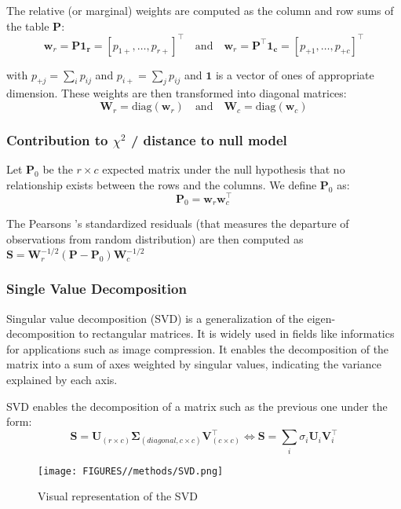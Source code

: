 The relative (or marginal) weights are computed as the column and row sums of the table $\mathbf{P}$: 
$$
    \mathbf{w}_r = \mathbf{P1_r}=\left[ p_{1+}, \dots, p_{r+}\right]^\top \quad \text{and} \quad \mathbf{w}_r = \mathbf{P}^\top \mathbf{1_c} = \left[ p_{+ 1}, \dots, p_{+ c}\right]^\top
$$

with $p_{+j} = \sum_ip_{ij}$ and $p_{i+} = \sum_jp_{ij}$ and $\mathbf{1}$ is a vector of ones of appropriate dimension. These weights are then transformed into diagonal matrices: 
$$
    \mathbf{W}_r = \text{diag}\left(\mathbf{w}_r\right) \quad \text{and} \quad \mathbf{W}_c = \text{diag}\left( \mathbf{w}_c \right)
$$

\subsubsection{Contribution to $\chi^2$ / distance to null model} \label{abund_effect_ca}

Let $\mathbf{P}_0$ be the $r\times c$ expected matrix under the null hypothesis that no relationship exists between the rows and the columns. We define $\mathbf{P}_0$ as:
$$
    \mathbf{P}_0 = \mathbf{w}_r \mathbf{w}_c^\intercal
$$

The Pearsons 's standardized residuals (that measures the departure of observations from random distribution) are then computed as $\mathbf{S} = \mathbf{W}_r^{-1/2} (\mathbf{P} - \mathbf{P}_0) \mathbf{W}_c^{-1/2}$

\subsubsection{Single Value Decomposition}

Singular value decomposition (SVD) is a generalization of the eigen-decomposition to rectangular matrices. It is widely used in fields like informatics for applications such as image compression. It enables the decomposition of the matrix into a sum of axes weighted by singular values, indicating the variance explained by each axis.

SVD enables the decomposition of a matrix such as the previous one under the form: 
$$
    \mathbf{S} = \mathbf{U}_{(r\times c)} \mathbf{\Sigma}_{(diagonal, c\times c)} \mathbf{V}_{(c \times c)}^\intercal \Leftrightarrow \mathbf{S} = \sum_i \sigma_i \mathbf{U}_i \mathbf{V}_i^\intercal
$$

\begin{figure}[h]
    \centering
    \texttt{[image: FIGURES//methods/SVD.png]}
    \caption{Visual representation of the SVD}
    \label{fig:SVD}
\end{figure}

